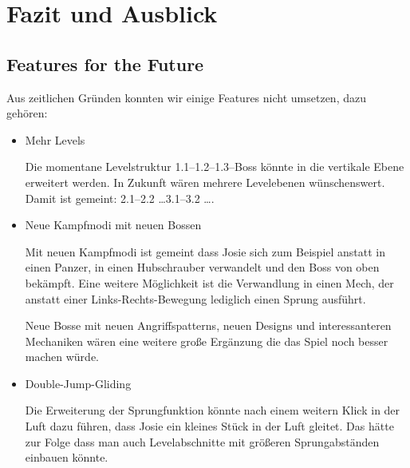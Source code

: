 \chapter{Fazit und Ausblick}

\section{Features for the Future}

Aus zeitlichen Gründen konnten wir einige Features nicht umsetzen, dazu gehören:

\begin{itemize}

\item Mehr Levels

Die momentane Levelstruktur 1.1--1.2--1.3--Boss könnte in die vertikale Ebene erweitert werden. In Zukunft wären mehrere Levelebenen wünschenswert. Damit ist gemeint: 2.1--2.2 \dots 3.1--3.2 \dots.

\item Neue Kampfmodi mit neuen Bossen

Mit neuen Kampfmodi ist gemeint dass Josie sich zum Beispiel anstatt in einen Panzer, in einen Hubschrauber verwandelt und den Boss von oben bekämpft. Eine weitere Möglichkeit ist die Verwandlung in einen Mech, der anstatt einer Links-Rechts-Bewegung lediglich einen Sprung ausführt.

Neue Bosse mit neuen Angriffspatterns, neuen Designs und interessanteren Mechaniken wären eine weitere große Ergänzung die das Spiel noch besser machen würde.

\item Double-Jump-Gliding

Die Erweiterung der Sprungfunktion könnte nach einem weitern Klick in der Luft dazu führen, dass Josie ein kleines Stück in der Luft gleitet. Das hätte zur Folge dass man auch Levelabschnitte mit größeren Sprungabständen einbauen könnte.

\end{itemize}
